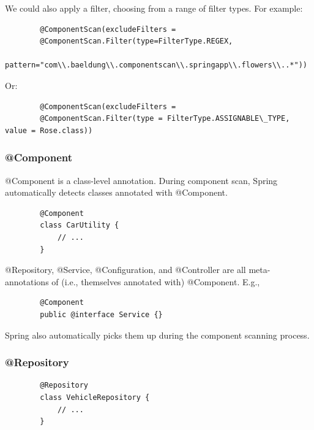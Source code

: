 \documentclass{scrartcl}
\begin{document}
    We could also apply a filter, choosing from a range of filter types. For example:

    \begin{lstlisting}
        @ComponentScan(excludeFilters =
        @ComponentScan.Filter(type=FilterType.REGEX,
        pattern="com\\.baeldung\\.componentscan\\.springapp\\.flowers\\..*"))
    \end{lstlisting}

    Or:
    \begin{lstlisting}
        @ComponentScan(excludeFilters =
        @ComponentScan.Filter(type = FilterType.ASSIGNABLE\_TYPE, value = Rose.class))
    \end{lstlisting}

\subsubsection{@Component}

    @Component is a class-level annotation. During component scan, Spring automatically detects classes annotated with @Component.

    \begin{lstlisting}
        @Component
        class CarUtility {
            // ...
        }
    \end{lstlisting}

    @Repository, @Service, @Configuration, and @Controller are all meta-annotations of (i.e., themselves annotated with) @Component. E.g.,

      \begin{lstlisting}
        @Component
        public @interface Service {}
    \end{lstlisting}

    Spring also automatically picks them up during the component scanning process.


\subsubsection{@Repository}

    \begin{lstlisting}
        @Repository
        class VehicleRepository {
            // ...
        }
    \end{lstlisting}
\end{document}
